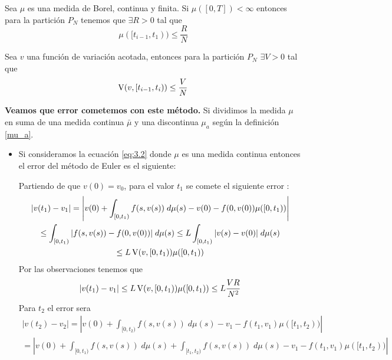 \begin{obs}
	Sea $\mu$ es una medida de Borel, continua y finita. Si $\mu([0,T])<\infty$ entonces para la partición $P_N$ tenemos que $\exists R>0$ tal que $$\mu([t_{i-1},t_1))\leq \dfrac{R}{N}$$
\end{obs}
\begin{obs}
	Sea $v$ una función de variación acotada, entonces para la partición $P_N$  $\exists V>0$ tal que
	$$\operatorname{V}(v,[t_{i-1},t_i))\leq \dfrac{V}{N}$$ 
\end{obs}
\textbf{Veamos que error cometemos con este método.}
Si dividimos la medida $\mu$ en suma de una medida continua $\bar{\mu}$ y una discontinua $\mu_a$ según la definición \ref{mu_a}.
\begin{itemize}
	\item  Si consideramos la ecuación \ref{eq:3.2} donde $\mu$ es una medida continua entonces el error del método de Euler es el siguiente:


 Partiendo de que $v(0)=v_0$, para el valor $t_1$ se comete el siguiente error :
\begin{multline*}
	|v(t_1)-v_1|=\left| v(0)+\int_{[0,t_1)}f(s,v(s))\; d\mu(s)-v(0)-f(0,v(0))\mu([0,t_1))\right| \\
	\leq \int_{[0,t_1)}|f(s,v(s))-f(0,v(0))|\; d\mu(s)\leq L\int_{[0,t_1)}|v(s)-v(0)|\; d\mu(s)\\
	\leq L \operatorname{V}(v,[0,t_1))\mu([0,t_1))
\end{multline*}
 Por las observaciones  tenemos que 
 \begin{equation}
 	|v(t_1)-v_1|\leq L \operatorname{V}(v,[0,t_1))\mu([0,t_1))\leq L\dfrac{VR}{N^2}
 \end{equation}
 Para $t_2$ el error sera
\begin{multline*}
	|v(t_2)-v_2|=\left| v(0)+\int_{[0,t_2)}f(s,v(s))\; d\mu(s)-v_1-f(t_1,v_1)\mu([t_1,t_2))\right| \\
	=\left| v(0)+\int_{[0,t_1)}f(s,v(s))\; d\mu(s)+\int_{[t_1,t_2)}f(s,v(s))\; d\mu(s)-v_1-f(t_1,v_1)\mu([t_1,t_2))\right| 
\end{multline*}


\end{itemize}
